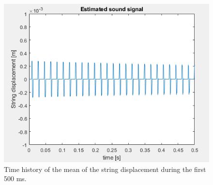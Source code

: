 \documentclass[a4paper]{article}
\begin{document}
 \begin{figure}[h]
	\centering
	\includegraphics[width=0.75\linewidth]{sound_one.png}
	\caption{Time history of the mean of the string displacement during the first 500 ms.}
	\label{fig:historytwo}
\end{figure}


\printbibliography
\end{document}
